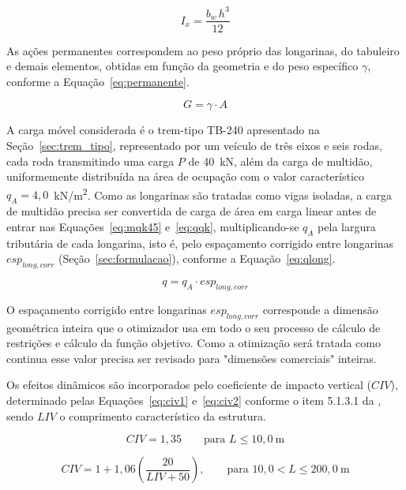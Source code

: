 \begin{equation}
I_x = \frac{b_w\,h^3}{12}
\label{eq:iret}
\end{equation}

As ações permanentes correspondem ao peso próprio das longarinas, do tabuleiro e demais elementos, obtidas em função da geometria e do peso específico $\gamma$, conforme a Equação~\eqref{eq:permanente}.

\begin{equation}
G = \gamma \cdot A
\label{eq:permanente}
\end{equation}

A carga móvel considerada é o trem-tipo TB-240 apresentado na Seção~\ref{sec:trem_tipo}, representado por um veículo de três eixos e seis rodas, cada roda transmitindo uma carga $P$ de 40~kN, além da carga de multidão, uniformemente distribuída na área de ocupação com o valor característico $q_A = 4{,}0$~kN/m\textsuperscript{2}.
Como as longarinas são tratadas como vigas isoladas, a carga de multidão precisa ser convertida de carga de área em carga linear antes de entrar nas Equações~\eqref{eq:mqk45} e~\eqref{eq:qqk}, multiplicando-se $q_A$ pela largura tributária de cada longarina, isto é, pelo espaçamento corrigido entre longarinas $esp_{long,corr}$ (Seção~\ref{sec:formulacao}), conforme a Equação~\eqref{eq:qlong}.

\begin{equation}
q = q_A \cdot esp_{long,corr}
\label{eq:qlong}
\end{equation}

O espaçamento corrigido entre longarinas $esp_{long,corr}$ corresponde a dimensão geométrica inteira que o otimizador usa em todo o seu processo de cálculo de restrições e cálculo da função objetivo. Como a otimização será tratada como continua esse valor precisa ser revisado para "dimensões comerciais" inteiras.

Os efeitos dinâmicos são incorporados pelo coeficiente de impacto vertical ($CIV$), determinado pelas Equações~\eqref{eq:civ1} e~\eqref{eq:civ2} conforme o item 5.1.3.1 da \textcite{nbr7188}, sendo $LIV$ o comprimento característico da estrutura.

\begin{equation}
CIV = 1{,}35 \qquad \text{para } L \leq 10{,}0\ \text{m}
\label{eq:civ1}
\end{equation}

\begin{equation}
CIV = 1 + 1{,}06\left(\frac{20}{LIV + 50}\right), \qquad \text{para } 10{,}0 < L \leq 200{,}0\ \text{m}
\label{eq:civ2}
\end{equation}

